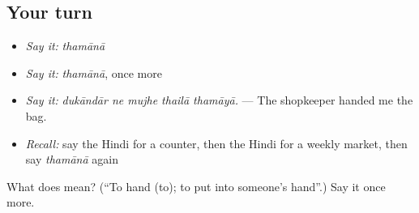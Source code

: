 \subsection*{Your turn}
\begin{itemize}
\raggedright
  \item \emph{Say it:} \emph{thamānā}
  \item \emph{Say it:} \emph{thamānā}, once more
  \item \emph{Say it:} \emph{dukāndār ne mujhe thailā thamāyā.} — The shopkeeper handed me the bag.
  \item \emph{Recall:} say the Hindi for a counter, then the Hindi for a weekly market, then say \emph{thamānā} again
\end{itemize}

\begin{tcolorbox}[breakable,colback=teal!4,colframe=teal!35!black,title={Before you move on}]
What does  mean? (\textquotedblleft{}To hand (to); to put into someone's hand\textquotedblright{}.) Say it once more.
\end{tcolorbox}
